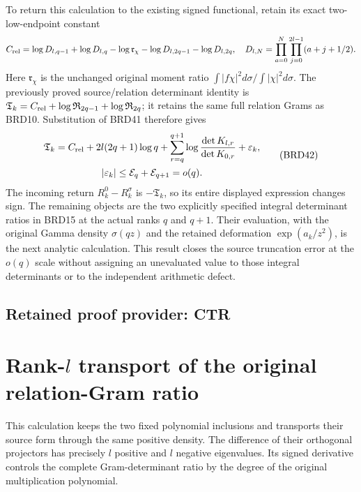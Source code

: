 \documentclass[11pt,a4paper]{article}
\begin{document}
To return this calculation to the existing signed functional,
retain its exact two-low-endpoint constant
\[
 C_{\rm rel}=\log D_{l,q-1}+\log D_{l,q}
 -\log\mathfrak r_\chi-\log D_{l,2q-1}-\log D_{l,2q},
 \quad D_{l,N}=\prod_{a=0}^N\prod_{j=0}^{2l-1}(a+j+1/2).
\]
Here $\mathfrak r_\chi$ is the unchanged original moment ratio
$\int|f\chi|^2d\sigma/\int|\chi|^2d\sigma$.
The previously proved source/relation determinant identity is
$\mathfrak T_k=C_{\rm rel}+\log\mathfrak R_{2q-1}
+\log\mathfrak R_{2q}$; it retains the same full relation Grams
as BRD10. Substitution of BRD41 therefore gives
\[
\begin{gathered}
 \mathfrak T_k=C_{\rm rel}+2l(2q+1)\log q
   +\sum_{r=q}^{q+1}\log\frac{\det K_{l,r}}{\det K_{0,r}}
   +\varepsilon_k,\\
 |\varepsilon_k|\leq\mathcal E_q+\mathcal E_{q+1}=o(q).
\end{gathered}\tag{BRD42}
\]
The incoming return $R_k^0-R_k^\sigma$ is $-\mathfrak T_k$,
so its entire displayed expression changes sign. The remaining
objects are the two explicitly specified integral determinant
ratios in BRD15 at the actual ranks $q$ and $q+1$. Their
evaluation, with the original Gamma density $\sigma(qz)$ and
the retained deformation $\exp(a_k/z^2)$, is the next analytic
calculation. This result closes the source truncation error at
the $o(q)$ scale without assigning an unevaluated value to those
integral determinants or to the independent arithmetic defect.


\clearpage
\subsection*{Retained proof provider: CTR}

\section{Rank-$l$ transport of the original relation-Gram ratio}

This calculation keeps the two fixed polynomial inclusions and transports
their source form through the same positive density. The difference of
their orthogonal projectors has precisely $l$ positive and $l$ negative
eigenvalues. Its signed derivative controls the complete Gram-determinant
ratio by the degree of the original multiplication polynomial.
\end{document}
